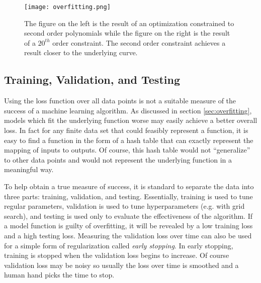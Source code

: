 \begin{figure}
    \centering
    \texttt{[image: overfitting.png]}
    \caption{The figure on the left is the result of an optimization constrained to second order polynomials while the figure on the right is the result of a $20^{th}$ order constraint.  The second order constraint achieves a result closer to the underlying curve.}
    \label{fig:poly_reg}
\end{figure}

\subsection{Training, Validation, and Testing}
Using the loss function over all data points is not a suitable measure of the success of a machine learning algorithm.  As discussed in section \ref{sec:overfitting}, models which fit the underlying function worse may easily achieve a better overall loss.  In fact for any finite data set that could feasibly represent a function, it is easy to find a function in the form of a hash table that can exactly represent the mapping of inputs to outputs.  Of course, this hash table would not ``generalize'' to other data points and would not represent the underlying function in a meaningful way.  

To help obtain a true measure of success, it is standard to separate the data into three parts: training, validation, and testing.  Essentially, training is used to tune regular parameters, validation is used to tune hyperparameters (e.g. with grid search), and testing is used only to evaluate the effectiveness of the algorithm.  If a model function is guilty of overfitting, it will be revealed by a low training loss and a high testing loss.  Measuring the validation loss over time can also be used for a simple form of regularization called \textit{early stopping}.  In early stopping, training is stopped when the validation loss begins to increase.  Of course validation loss may be noisy so usually the loss over time is smoothed and a human hand picks the time to stop.
